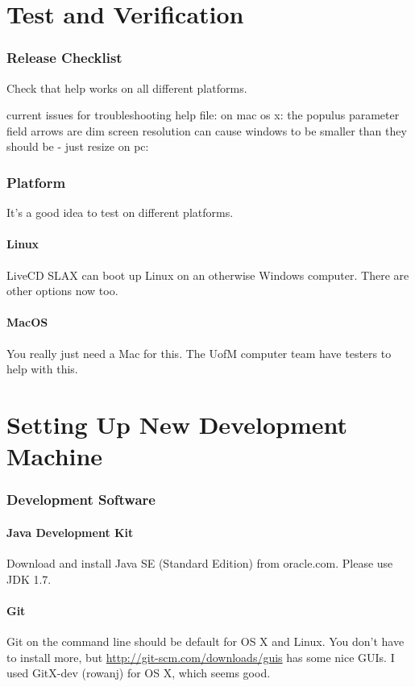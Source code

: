 \documentclass[12pt]{article}
\begin{document}
\part{Test and Verification}
\section{Release Checklist}

Check that help works on all different platforms.


current issues for troubleshooting help file:
on mac os x:
the populus parameter field arrows are dim
screen resolution can cause windows to be smaller than they should be - just resize
on pc:


\section{Platform}
It's a good idea to test on different platforms.
\subsection{Linux}
LiveCD SLAX can boot up Linux on an otherwise Windows computer.  There are other options now too.
\subsection{MacOS}
You really just need a Mac for this.  The UofM computer team have testers to help with this.

\part{Setting Up New Development Machine}
\section{Development Software}
\subsection{Java Development Kit}
Download and install Java SE (Standard Edition) from oracle.com.  Please use JDK 1.7.

\subsection{Git}
Git on the command line should be default for OS X and Linux.  You don't have to install more, but \url{http://git-scm.com/downloads/guis} has some nice GUIs.  I used GitX-dev (rowanj) for OS X, which seems good.
\end{document}
